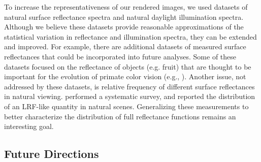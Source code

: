 \documentclass{jov}
\begin{document}
To increase the representativeness of our rendered images, we used datasets of natural surface reflectance spectra and natural daylight illumination spectra. Although we believe these datasets provide reasonable approximations of the statistical variation in reflectance and illumination spectra, they can be extended and improved. For example, there are additional datasets of measured surface reflectances that could be incorporated into future analyses. Some of these datasets focused on the reflectance of objects (e.g. fruit) that are thought to be important for the evolution of primate color vision (e.g., ). Another issue, not addressed by these datasets, is relative frequency of different surface reflectances in natural viewing.  performed a systematic survey, and reported the distribution of an LRF-like quantity in natural scenes. Generalizing these measurements to better characterize the distribution of full reflectance functions remains an interesting goal. 

\subsection{Future Directions}
\end{document}
